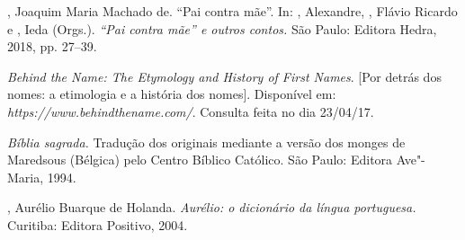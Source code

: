 \begin{Parskip}
, Joaquim Maria Machado de. ``Pai contra mãe''. In: ,
Alexandre, , Flávio Ricardo e , Ieda (Orgs.).
\emph{``Pai contra mãe'' e outros contos.} São Paulo: Editora Hedra,
2018, pp. 27--39.

\emph{Behind the Name: The Etymology and History of First Names}. [Por
detrás dos nomes: a etimologia e a história dos nomes]. Disponível em:
\emph{https://www.behindthename.com/}.
Consulta feita no dia 23/04/17.

\emph{Bíblia sagrada.} Tradução dos originais mediante a versão dos
monges de Maredsous (Bélgica) pelo Centro Bíblico Católico. São Paulo:
Editora Ave"-Maria, 1994.

, Aurélio Buarque de Holanda. \emph{Aurélio: o dicionário da
língua portuguesa.} Curitiba: Editora Positivo, 2004.
\end{Parskip}